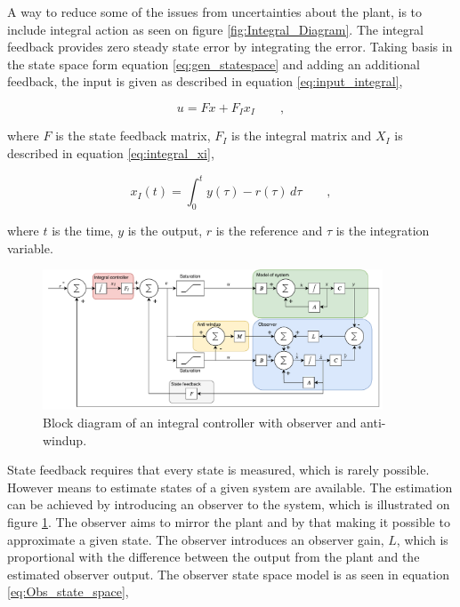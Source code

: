 \documentclass[../../main.tex]{subfiles}
\begin{document}
A way to reduce some of the issues from uncertainties about the plant, is to include integral action as seen on figure \ref{fig:Integral_Diagram}. The integral feedback provides zero steady state error by integrating the error. Taking basis in the state space form equation \ref{eq:gen_statespace} and adding an additional feedback, the input is given as described in equation \ref{eq:input_integral},  

\begin{equation}\label{eq:input_integral}
        u=Fx+F_Ix_I \qquad , 
\end{equation}

where $F$ is the state feedback matrix, $F_I$ is the integral matrix and $X_{I}$ is described in equation \ref{eq:integral_xi},

\begin{equation}\label{eq:integral_xi}
    x_I(t)=\int_0^t y(\tau)-r(\tau)\,d\tau \qquad ,
\end{equation}

where $t$ is the time, $y$ is the output, $r$ is the reference and $\tau$ is the integration variable.

\begin{figure}
    \centering
    \includegraphics[width=0.9\textwidth]{Sections/Miscellaneous/Images/Anti_Windup_Integral_Observer.pdf}
    \caption{Block diagram of an integral controller with observer and anti-windup.}
    \label{fig:Integral_Observer_Diagram}
\end{figure}

State feedback requires that every state is measured, which is rarely possible. However means to estimate states of a given system are available. The estimation can be achieved by introducing an observer to the system, which is illustrated on figure \ref{fig:Integral_Observer_Diagram}. The observer aims to mirror the plant and by that making it possible to approximate a given state.
The observer introduces an observer gain, $L$, which is proportional with the difference between the output from the plant and the estimated observer output. The observer state space model is as seen in equation \ref{eq:Obs_state_space}, 
\end{document}

